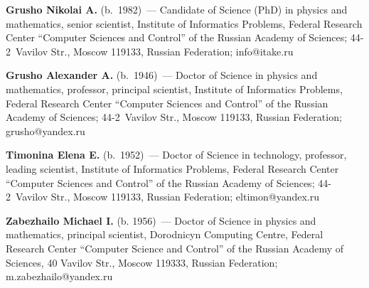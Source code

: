 \Contr

\noindent
\textbf{Grusho Nikolai A.} (b.\ 1982)~--- Candidate of Science (PhD) in physics and mathematics, 
senior scientist, Institute of Informatics Problems, Federal Research Center ``Computer Sciences and 
Control'' of the Russian Academy of Sciences; 44-2~Vavilov Str., Moscow 119133, Russian 
Federation; \mbox{info@itake.ru}


\noindent
\textbf{Grusho Alexander A.} (b.\ 1946)~--- Doctor of Science in physics and mathematics, professor, 
principal scientist, Institute of Informatics Problems, Federal Research Center ``Computer Sciences 
and Control'' of the Russian Academy of Sciences; 44-2~Vavilov Str., Moscow 119133, Russian 
Federation; \mbox{grusho@yandex.ru}

\vspace*{6pt}

\noindent
\textbf{Timonina Elena E.} (b.\ 1952)~--- Doctor of Science in technology, professor, leading scientist, 
Institute of Informatics Problems, Federal Research Center ``Computer Sciences and Control'' of the 
Russian Academy of Sciences; 44-2~Vavilov Str., Moscow 119133, Russian Federation; 
\mbox{eltimon@yandex.ru}


\vspace*{6pt}

\noindent
\textbf{Zabezhailo Michael I.} (b. 1956)~--- Doctor of Science in physics and mathematics, principal scientist, 
Dorodnicyn Computing Centre, Federal Research Center ``Computer Science 
and Control'' of the Russian 
Academy of Sciences, 40 Vavilov Str., Moscow 119333, Russian Federation; m.zabezhailo@yandex.ru

\label{end\stat}

\renewcommand{\bibname}{\protect\rm Литература} 